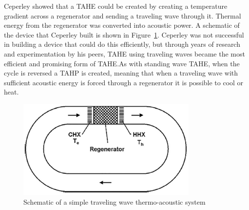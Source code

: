 \documentclass[a4paper]{article}
\newcommand{\newpara}
    {
      \bigbreak{}
      \noindent
    }
\begin{document}
\newpara{}
Ceperley\cite{ceperleyStirling} showed that a TAHE could be created by creating a temperature gradient across a regenerator and sending a traveling wave through it. Thermal energy from the regenerator was converted into acoustic power. A schematic of the device that Ceperley built is shown in Figure~\ref{ceperley}. Ceperley was not successful in building a device that could do this efficiently, but through years of research and experimentation by his peers, TAHE using traveling waves became the most efficient and promising form of TAHE.\@ As with standing wave TAHE, when the cycle is reversed a TAHP is created, meaning that when a traveling wave with sufficient acoustic energy is forced through a regenerator it is possible to cool or heat.
\begin{figure}[ht]
  \centering
  \includegraphics[width=0.8\textwidth]{images/ceperley.png}
  \caption{Schematic of a simple traveling wave thermo-acoustic system\cite{powerofsound}}\label{ceperley}
\end{figure}
\end{document}
